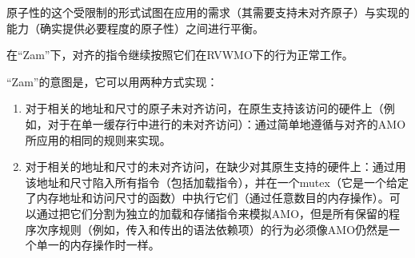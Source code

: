原子性的这个受限制的形式试图在应用的需求（其需要支持未对齐原子）与实现的能力（确实提供必要程度的原子性）之间进行平衡。

在“Zam”下，对齐的指令继续按照它们在RVWMO下的行为正常工作。

\begin{commentary}
  “Zam”的意图是，它可以用两种方式实现：
  \begin{enumerate}
    \item 对于相关的地址和尺寸的原子未对齐访问，在原生支持该访问的硬件上（例如，对于在单一缓存行中进行的未对齐访问）：通过简单地遵循与对齐的AMO所应用的相同的规则来实现。
    \item 对于相关的地址和尺寸的未对齐访问，在缺少对其原生支持的硬件上：通过用该地址和尺寸陷入所有指令（包括加载指令），并在一个mutex（它是一个给定了内存地址和访问尺寸的函数）中执行它们（通过任意数目的内存操作）。可以通过把它们分割为独立的加载和存储指令来模拟AMO，但是所有保留的程序次序规则（例如，传入和传出的语法依赖项）的行为必须像AMO仍然是一个单一的内存操作时一样。
  \end{enumerate}
\end{commentary}
